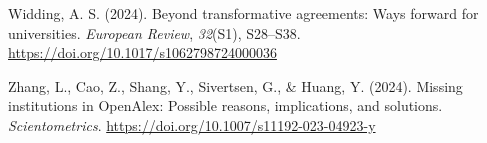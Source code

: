 \documentclass[a4paper,man,floatsintext,longtable,noextraspace,10pt]{apa6}
\newlength{\cslhangindent}
\newenvironment{CSLReferences}[2] %
{\begin{list}{}{%
  \setlength{\itemindent}{0pt}
  \setlength{\leftmargin}{0pt}
  \setlength{\parsep}{0pt}
  \ifodd #1
  \setlength{\leftmargin}{\cslhangindent}
  \setlength{\itemindent}{-1\cslhangindent}
  \fi
  \setlength{\itemsep}{#2\baselineskip}}}
{\end{list}}
\begin{document}
\begin{CSLReferences}{1}{0}
Widding, A. S. (2024). Beyond transformative agreements: Ways forward
for universities. \emph{European Review}, \emph{32}(S1), S28--S38.
\url{https://doi.org/10.1017/s1062798724000036}

Zhang, L., Cao, Z., Shang, Y., Sivertsen, G., \& Huang, Y. (2024).
Missing institutions in OpenAlex: Possible reasons, implications, and
solutions. \emph{Scientometrics}.
\url{https://doi.org/10.1007/s11192-023-04923-y}

\end{CSLReferences}
\end{document}

